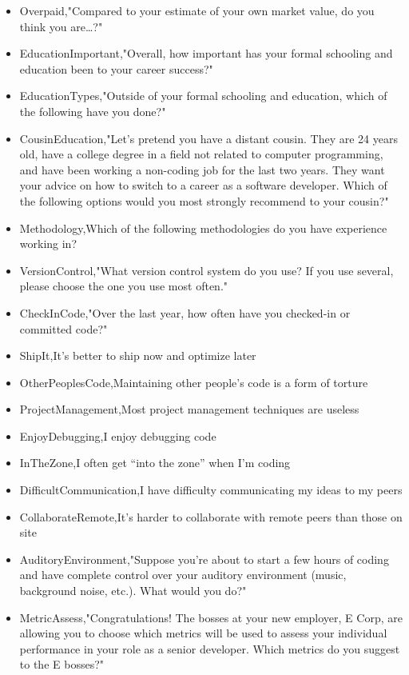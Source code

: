\begin{appendices}
\begin{itemize}
        \item Overpaid,"Compared to your estimate of your own market value, do you think you are…?"
        \item EducationImportant,"Overall, how important has your formal schooling and education been to your career success?"
        \item EducationTypes,"Outside of your formal schooling and education, which of the following have you done?"
        \item CousinEducation,"Let's pretend you have a distant cousin. They are 24 years old, have a college degree in a field not related to computer programming, and have been working a non-coding job for the last two years. They want your advice on how to switch to a career as a software developer. Which of the following options would you most strongly recommend to your cousin?"
        \item Methodology,Which of the following methodologies do you have experience working in?
        \item VersionControl,"What version control system do you use? If you use several, please choose the one you use most often."
        \item CheckInCode,"Over the last year, how often have you checked-in or committed code?"
        \item ShipIt,It's better to ship now and optimize later
        \item OtherPeoplesCode,Maintaining other people's code is a form of torture
        \item ProjectManagement,Most project management techniques are useless
        \item EnjoyDebugging,I enjoy debugging code
        \item InTheZone,I often get “into the zone” when I'm coding
        \item DifficultCommunication,I have difficulty communicating my ideas to my peers
        \item CollaborateRemote,It's harder to collaborate with remote peers than those on site
        \item AuditoryEnvironment,"Suppose you're about to start a few hours of coding and have complete control over your auditory environment (music, background noise, etc.). What would you do?"
        \item MetricAssess,"Congratulations! The bosses at your new employer, E Corp, are allowing you to choose which metrics will be used to assess your individual performance in your role as a senior developer. Which metrics do you suggest to the E bosses?"

\end{itemize}
\end{appendices}
